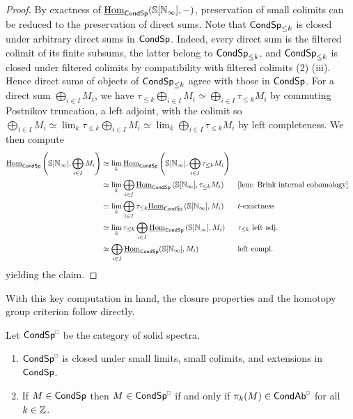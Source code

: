 \begin{proof}
    By exactness of $\underline{\mathrm{Hom}}_{\mathsf{Cond}\mathsf{Sp}}(\mathbb{S}[\mathbb{N}_{\infty}],-)$, preservation of small colimits can be reduced to the preservation of direct sums. Note that $\mathsf{Cond}\mathsf{Sp}_{\leq k}$ is closed under arbitrary direct sums in $\mathsf{Cond}\mathsf{Sp}$. Indeed, every direct sum is the filtered colimit of its finite subsums, the latter belong to $\mathsf{Cond}\mathsf{Sp}_{\leq k}$, and $\mathsf{Cond}\mathsf{Sp}_{\leq k}$ is closed under filtered colimits by compatibility with filtered colimits  (2) (iii). Hence direct sums of objects of $\mathsf{Cond}\mathsf{Sp}_{\leq k}$ agree with those in $\mathsf{Cond}\mathsf{Sp}$. For a direct sum $\bigoplus_{i\in I}M_{i}$, we have $\tau_{\leq k}\bigoplus_{i\in I}M_{i}\simeq\bigoplus_{i\in I}\tau_{\leq k}M_{i}$ by commuting Postnikov truncation, a left adjoint, with the colimit so $\bigoplus_{i\in I}M_{i}\simeq\lim_{k}\tau_{\leq k}\bigoplus_{i\in I}M_{i}\simeq\lim_{k}\bigoplus_{i\in I}\tau_{\leq k}M_{i}$ by left completeness. We then compute 
    \begin{align*}
        \intHom_{\Cond\Sp}\left(\Sph[\NN_{\infty}],\bigoplus_{i\in I}M_{i}\right) &\simeq \lim_{k}\intHom_{\Cond\Sp}\left(\Sph[\NN_{\infty}],\bigoplus_{i\in I}\tau_{\leq k}M_{i}\right) \\
        &\simeq\lim_{k}\bigoplus_{i\in I}\intHom_{\Cond\Sp}\left(\Sph[\NN_{\infty}],\tau_{\leq k}M_{i}\right) && \text{\Cref{lem: Brink internal cohomology}} \\
        &\simeq \lim_{k}\bigoplus_{i\in I}\tau_{\leq k}\intHom_{\Cond\Sp}\left(\Sph[\NN_{\infty}],M_{i}\right) && t\text{-exactness} \\
        &\simeq \lim_{k}\tau_{\leq k}\bigoplus_{i\in I}\intHom_{\Cond\Sp}\left(\Sph[\NN_{\infty}],M_{i}\right) && \tau_{\leq k}\text{ left adj.} \\
        &\simeq \bigoplus_{i\in I}\intHom_{\Cond\Sp}(\Sph[\NN_{\infty}],M_{i}) && \text{left compl.}
    \end{align*}
    yielding the claim. 
\end{proof}
With this key computation in hand, the closure properties and the homotopy group criterion follow directly.
\begin{theorem}\label{thm: properties of solid spectra}
    Let $\Cond\Sp^{\sld}$ be the category of solid spectra. 
    \begin{enumerate}
        \item $\Cond\Sp^{\sld}$ is closed under small limits, small colimits, and extensions in $\mathsf{Cond}\mathsf{Sp}$. 
        \item If $M\in\mathsf{Cond}\mathsf{Sp}$ then $M\in\Cond\Sp^{\sld}$ if and only if $\pi_{k}(M)\in\Cond\Ab^{\sld}$ for all $k\in\mathbb{Z}$. 
    \end{enumerate}
\end{theorem}

